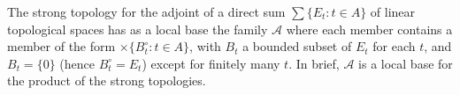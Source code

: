 The strong topology for the adjoint of a direct sum $\sum\{E_t : t \in A\}$ of linear topological spaces has as a local base the family $\mathcal{A}$ where each member contains a member of the form $\times \{B_t^\circ : t \in A\}$, with $B_t$ a bounded subset of $E_t$ for each $t$, and $B_t = \{0\}$ (hence $B_t^\circ = E_t$) except for finitely many $t$. In brief, $\mathcal{A}$ is a local base for the product of the strong topologies.
